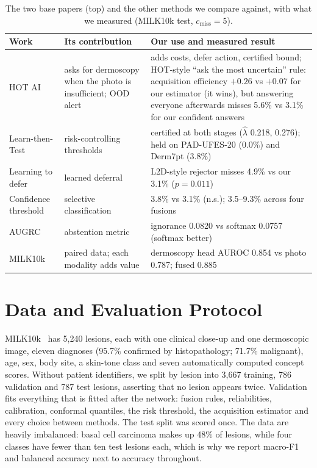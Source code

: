 \documentclass[conference]{IEEEtran}
\begin{document}
\begin{table}[t]
\caption{The two base papers (top) and the other methods we compare against, with what we measured (MILK10k test, $c_{\mathrm{miss}}=5$).}
\label{tab:related}
\centering\scriptsize\setlength{\tabcolsep}{2.5pt}
\begin{tabular}{@{}p{}p{}p{}@{}}
\toprule
Work & Its contribution & Our use and measured result \\
\midrule
HOT AI~\cite{r2} & asks for dermoscopy when the photo is insufficient; OOD alert & adds costs, defer action, certified bound; HOT-style ``ask the most uncertain'' rule: acquisition efficiency $+0.26$ vs $+0.07$ for our estimator (it wins), but answering everyone afterwards misses 5.6\% vs 3.1\% for our confident answers \\
Learn-then-Test~\cite{r3} & risk-controlling thresholds & certified at both stages ($\hat\lambda$ 0.218, 0.276); held on PAD-UFES-20 (0.0\%) and Derm7pt (3.8\%) \\
Learning to defer~\cite{r25} & learned deferral & L2D-style rejector misses 4.9\% vs our 3.1\% ($p=0.011$) \\
Confidence threshold~\cite{r24} & selective classification & 3.8\% vs 3.1\% (n.s.); 3.5--9.3\% across four fusions \\
AUGRC~\cite{r7} & abstention metric & ignorance 0.0820 vs softmax 0.0757 (softmax better) \\
MILK10k~\cite{r4,r5} & paired data; each modality adds value & dermoscopy head AUROC 0.854 vs photo 0.787; fused 0.885 \\
\bottomrule
\end{tabular}
\end{table}

\section{Data and Evaluation Protocol}
MILK10k~\cite{r4} has 5,240 lesions, each with one clinical close-up and one dermoscopic image, eleven diagnoses (95.7\% confirmed by histopathology; 71.7\% malignant), age, sex, body site, a skin-tone class and seven automatically computed concept scores. Without patient identifiers, we split by lesion into 3,667 training, 786 validation and 787 test lesions, asserting that no lesion appears twice. Validation fits everything that is fitted after the network: fusion rules, reliabilities, calibration, conformal quantiles, the risk threshold, the acquisition estimator and every choice between methods. The test split was scored once. The data are heavily imbalanced: basal cell carcinoma makes up 48\% of lesions, while four classes have fewer than ten test lesions each, which is why we report macro-F1 and balanced accuracy next to accuracy throughout.
\end{document}
